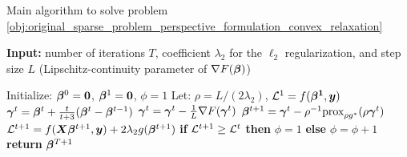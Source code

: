 \begin{algorithm}[!b]
    \caption{Main algorithm to solve problem \eqref{obj:original_sparse_problem_perspective_formulation_convex_relaxation}}
    \label{alg:main_algorithm}
    \begin{flushleft}
    \textbf{Input:} number of iterations $T$, coefficient $\lambda_2$ for the $\ell_2$ regularization, and step size $L$ (Lipschitz-continuity parameter of $\nabla F(\bm{\beta})$)  
    \end{flushleft}
    \begin{algorithmic}[1]
        \STATE Initialize: $\bm{\beta}^0 = \mathbf{0}$, $\bm{\beta}^1 = \mathbf{0}$, $\phi = 1$
        \STATE Let: $\rho = L / (2\lambda_2)$, $\mathcal{L}^1 = f(\mathbf{\bm{\beta}^1}, \bm{y})$
            \STATE {} 
            \STATE $\bm{\gamma}^t = \bm{\beta}^t + \frac{t}{t+3} (\bm{\beta}^t - \bm{\beta}^{t-1})$ \vspace{1.5mm}
            \STATE {} 
            \STATE $\bm{\gamma}^t = \bm{\gamma}^t - \frac{1}{L} \nabla F(\bm{\gamma}^t)$ \label{alg_line:gradient_descent} 
            \STATE $\bm{\beta}^{t+1} = \bm{\gamma}^t - \rho^{-1} \text{prox}_{\rho g^*} (\rho \bm{\gamma}^t)$ \label{alg_line:proximal_step} \vspace{1.5mm} 
            \STATE {}
            \STATE $\mathcal{L}^{t+1} = f(\bm{X} \bm{\beta}^{t+1}, \bm{y}) + 2 \lambda_2 g(\bm{\beta}^{t+1})$
            \STATE \textbf{if} $\mathcal{L}^{t+1} \geq \mathcal{L}^{t}$ \textbf{then} $\phi = 1$ \textbf{else} $\phi = \phi + 1$
        \ENDFOR
        \STATE \textbf{return} $\bm{\beta}^{T+1}$
    \end{algorithmic}
\end{algorithm}
